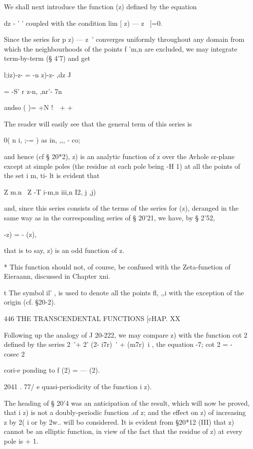 {We shall next introduce the function (z) defined by the equation

dz - ' ' coupled with the condition lim [ z) — z~ ]=0.

Since the series for p z) — z~' converges uniformly throughout any
domain from which the neighbourhoods of the points f 'm,n are
excluded, we may integrate term-by-term (§ 4'7) and get

l;iz)-z- = -n z)-z- ,dz J

= -S' r z-n, ,nr'- 7n%

andso ( )= +N !\ \ + +

The reader will easily see that the general term of this series is

0( n i, ;-= ) as in, ,,, - co;

and hence (cf § 20*2), z) is an analytic function of z over the Avhole
sr-plane except at simple poles (the residue at each pole being -H 1)
at all the points of the set i m, ti- lt is evident that

Z m.n \ Z -T i-m,n iii,n I2, j ,j)

and, since this series consists of the terms of the series for (z),
deranged in the same way as in the corresponding series of § 20'21, we
have, by § 2'52,

  -z) = - (z),

that is to say, z) is an odd function of z.

* This function should not, of course, be confused with the
Zeta-funetion of Eieraann, discussed in Chapter xni.

t The symbol il' , is used to denote all the points fl, ,,i with the
exception of the origin (cf. §20-2).

446 THE TRANSCENDENTAL FUNCTIONS [cHAP. XX

Following up the analogy of J 20-222, we may compare z) with the
function cot 2 defined by the series 2~'+ 2' (2- i7r)~' + (m7r)~i ,
the equation -7; cot 2 = - cosec 2

cori-e ponding to f (2) = — (2).

2041 . 77/ e quasi-periodicity of the function i z).

The heading of § 20'4 was an anticipation of the result, which will
now be proved, that i z) is not a doubly-periodic function .of z; and
the effect on z) of increasing z by 2( i or by 2w.. will bo
considered. It is evident from §20*12 (III) that z) cannot be an
elliptic function, in view of the fact that the residue of z) at every
pole is + 1.

}
